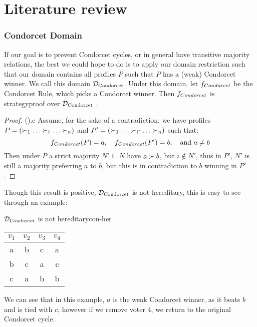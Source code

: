\newpage
\chapter{Literature review}
\label{Literature}






\subsection{Condorcet Domain}
If our goal is to prevent Condorcet cycles, or in general have transitive majority relations, the best we could hope to do is to apply our domain restriction such that our domain contains all profiles $P$ such that $P$ has a (weak) Condorcet winner. We call this domain $\mathcal{D}_{\textnormal{Condorcet}}$. Under this domain, let $f_{\normalfont{Condorcet}}$ be the Condorcet Rule, which picks a Condorcet winner. Then $f_{\normalfont{Condorcet}}$ is strategyproof over $\mathcal{D}_{\textnormal{Condorcet}}$ \citep{elkindPreferenceRestrictionsComputational2022a}.

\begin{proof}{(\citet{elkindPreferenceRestrictionsComputational2022a}).}e
	Assume, for the sake of a contradiction, we have profiles $P = (\pref_1 \dots \pref_i \dots \pref_n)$ and $P' = (\pref_1 \dots \pref_{i'} \dots \pref_n)$ such that:
	\[
		f_{\normalfont{Condorcet}}(P) = a, \quad f_{\normalfont{Condorcet}}(P') = b, \quad \text{and } a \neq b
	\]
	Then under $P$ a strict majority $N' \subseteq N$ have $a \succ b$, but $i \notin N'$, thus in $P'$, $N'$ is still a majority preferring $a$ to $b$, but this is in contradiction to $b$ winning in $P'$.
\end{proof}


Though this result is positive, $\mathcal{D}_{\textnormal{Condorcet}}$ is not hereditary, this is easy to see through an example:
\begin{example}{$\mathcal{D}_{\textnormal{Condorcet}}$ is not hereditary}{con-her}
	\begin{minipage}{0.25\linewidth}
		\begin{tabular}{cccc}
			\toprule
			$v_1$ & $v_2$ & $v_3$ & $v_4$ \\
			\midrule
			a     & b     & c     & a     \\
			b     & c     & a     & c     \\
			c     & a     & b     & b     \\
			\bottomrule
		\end{tabular}
	\end{minipage}
	\begin{minipage}[b]{0.70\linewidth}
		We can see that in this example, $a$ is the weak Condorcet winner, as it beats $b$ and is tied with $c$, however if we remove voter 4, we return to the original Condorcet cycle.
	\end{minipage}
\end{example}

